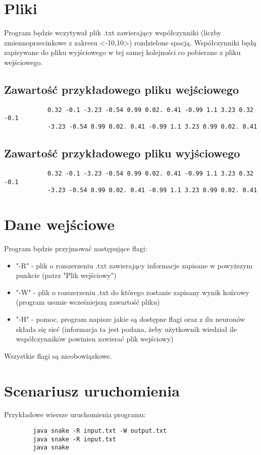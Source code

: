 \documentclass[12pt]{article}
\begin{document}
		 
	\section {Pliki}
	
		Program będzie wczytywał plik .txt zawierający współczynniki (liczby zmiennoprzecinkowe z zakresu <-10,10>) rozdzielone spacją. Współczynniki będą zapisywane do pliku wyjściowego w tej samej kolejności co pobierane z pliku wejściowego.
		\subsection{Zawartość przykładowego pliku wejściowego}
			\begin{verbatim}
			0.32 -0.1 -3.23 -0.54 0.99 0.02. 0.41 -0.99 1.1 3.23 0.32 -0.1 
			-3.23 -0.54 0.99 0.02. 0.41 -0.99 1.1 3.23 0.99 0.02. 0.41
			\end{verbatim}
			
		\subsection{Zawartość przykładowego pliku wyjściowego}
			\begin{verbatim}
			0.32 -0.1 -3.23 -0.54 0.99 0.02. 0.41 -0.99 1.1 3.23 0.32 -0.1 
			-3.23 -0.54 0.99 0.02. 0.41 -0.99 1.1 3.23 0.99 0.02. 0.41
			\end{verbatim}
	
	\section {Dane wejściowe}
		Program będzie przyjmować następujące flagi: 
		\begin{itemize}
			\item "-R" - plik o rozszerzeniu .txt zawierający informacje zapisane w powyższym punkcie (patrz "Plik wejściowy")
			\item "-W" - plik o rozszerzeniu .txt do którego zostanie zapisany wynik końcowy (program usunie wcześniejszą zawartość pliku)
			\item "-H" - pomoc, program napisze jakie są dostępne flagi oraz z ilu neuronów składa się sieć (informacja ta jest podana, żeby użytkownik wiedział ile współczynników powinien zawierać plik wejściowy)
		\end{itemize}
		Wszystkie flagi są nieobowiązkowe.
		
	\section{Scenariusz uruchomienia}
		Przykładowe wiersze uruchomienia programu:
		\begin{verbatim}
		java snake -R input.txt -W output.txt
		java snake -R input.txt 
		java snake
		\end{verbatim}
		
\end{document}
